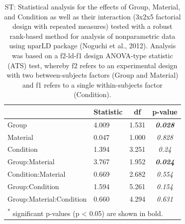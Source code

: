\documentclass[a4paper, twoside]{templates/ociamthesis}
\begin{document}
\begin{table}

\caption{\label{tab:ST-Tab-nparLD}ST: Statistical analysis for the effects of Group, Material, and Condition as well as their interaction (3x2x5 factorial design with repeated measures) tested with a robust rank-based method for analysis of nonparametric data using nparLD package (Noguchi et al., 2012). Analysis was based on a f2-ld-f1 design ANOVA-type statistic (ATS) test, whereby f2 refers to an experimental design with two between-subjects factors (Group and Material) and f1 refers to a single within-subjects factor (Condition).}
\centering
\begin{tabular}[t]{llc>{}c}
\toprule
  & Statistic & df & p-value\\
\midrule
Group & 4.009 & 1.531 & \em{\textbf{0.028}}\\
Material & 0.047 & 1.000 & \em{0.828}\\
Condition & 1.394 & 3.251 & \em{0.24}\\
Group:Material & 3.767 & 1.952 & \em{\textbf{0.024}}\\
Condition:Material & 0.669 & 2.682 & \em{0.554}\\
Group:Condition & 1.594 & 5.261 & \em{0.154}\\
Group:Material:Condition & 0.660 & 4.294 & \em{0.631}\\
\bottomrule
\multicolumn{4}{l}{\textsuperscript{*} significant p-values (p < 0.05) are shown in bold.}\\
\end{tabular}
\end{table}

\begin{table}

\caption{\label{tab:ST-PostHocTab-nparLD}ST: Post-hoc paired-comparison tests (Wilcoxon rank-sum test) for Group differences in z-scores split by material type.}
\centering
{}
\end{table}
\end{document}
